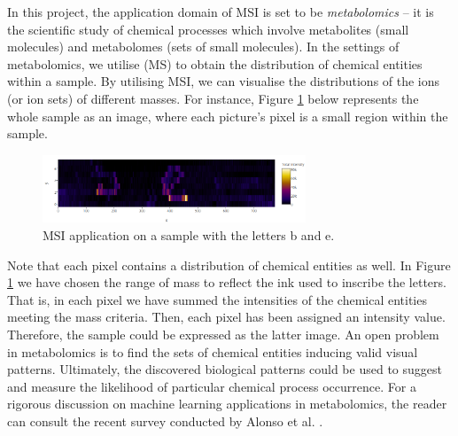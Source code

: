 \documentclass{mprop}
\begin{document}
\par In this project, the application domain of MSI is set to be \textit{metabolomics} -- it is the scientific study of chemical processes which involve metabolites (small molecules) and metabolomes (sets of small molecules). In the settings of metabolomics, we utilise  (MS) to obtain the distribution of chemical entities within a sample. By utilising MSI, we can visualise the distributions of the ions (or ion sets) of different masses. For instance, Figure \ref{fig:b_and_e} below represents the whole sample as an image, where each picture's pixel is a small region within the sample. 
\begin{figure}[H]
  \centering
  \includegraphics[width=0.7\textwidth]{b_and_e}
  \caption{MSI application on a sample with the letters b and e.}
  \label{fig:b_and_e}
\end{figure}
Note that each pixel contains a distribution of chemical entities as well. In Figure \ref{fig:b_and_e} we have chosen the range of mass to reflect the ink used to inscribe the letters. That is, in each pixel we have summed the intensities of the chemical entities meeting the mass criteria. Then, each pixel has been assigned an intensity value. Therefore, the sample could be expressed as the latter image. An open problem in metabolomics is to find the sets of chemical entities  inducing valid visual patterns. Ultimately, the discovered biological patterns could be used to suggest and measure the likelihood of particular chemical process occurrence. For a rigorous discussion on machine learning applications in metabolomics, the reader can consult the recent survey conducted by Alonso et al. \cite{alonso-et-al}.


\end{document}
